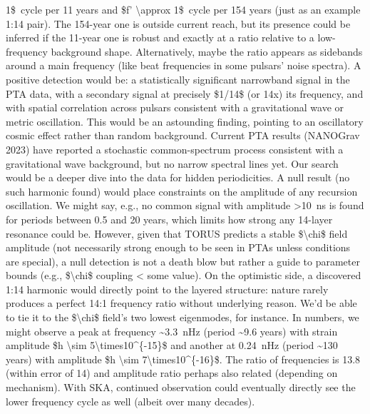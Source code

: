 \documentclass[]{article}
\begin{document}
\begin{enumerate}
  1\$~cycle per 11 years and \$f' \textbackslash{}approx 1\$~cycle per
  154 years (just as an example 1:14 pair). The 154-year one is outside
  current reach, but its presence could be inferred if the 11-year one
  is robust and exactly at a ratio relative to a low-frequency
  background shape. Alternatively, maybe the ratio appears as sidebands
  around a main frequency (like beat frequencies in some pulsars' noise
  spectra). A positive detection would be: a statistically significant
  narrowband signal in the PTA data, with a secondary signal at
  precisely \$1/14\$ (or 14x) its frequency, and with spatial
  correlation across pulsars consistent with a gravitational wave or
  metric oscillation. This would be an astounding finding, pointing to
  an oscillatory cosmic effect rather than random background. Current
  PTA results (NANOGrav 2023) have reported a stochastic common-spectrum
  process consistent with a gravitational wave background, but no narrow
  spectral lines yet. Our search would be a deeper dive into the data
  for hidden periodicities. A null result (no such harmonic found) would
  place constraints on the amplitude of any recursion oscillation. We
  might say, e.g., no common signal with amplitude \textgreater{}10~ns
  is found for periods between 0.5 and 20 years, which limits how strong
  any 14-layer resonance could be. However, given that TORUS predicts a
  stable \$\textbackslash{}chi\$ field amplitude (not necessarily strong
  enough to be seen in PTAs unless conditions are special), a null
  detection is not a death blow but rather a guide to parameter bounds
  (e.g., \$\textbackslash{}chi\$ coupling \textless{} some value). On
  the optimistic side, a discovered 1:14 harmonic would directly point
  to the layered structure: nature rarely produces a perfect 14:1
  frequency ratio without underlying reason. We'd be able to tie it to
  the \$\textbackslash{}chi\$ field's two lowest eigenmodes, for
  instance. In numbers, we might observe a peak at frequency
  \textasciitilde{}3.3~nHz (period \textasciitilde{}9.6 years) with
  strain amplitude \$h \textbackslash{}sim
  5\textbackslash{}times10\^{}\{-15\}\$ and another at 0.24~nHz (period
  \textasciitilde{}130 years) with amplitude \$h \textbackslash{}sim
  7\textbackslash{}times10\^{}\{-16\}\$. The ratio of frequencies is
  13.8 (within error of 14) and amplitude ratio perhaps also related
  (depending on mechanism). With SKA, continued observation could
  eventually directly see the lower frequency cycle as well (albeit over
  many decades).
\end{enumerate}
\end{document}

